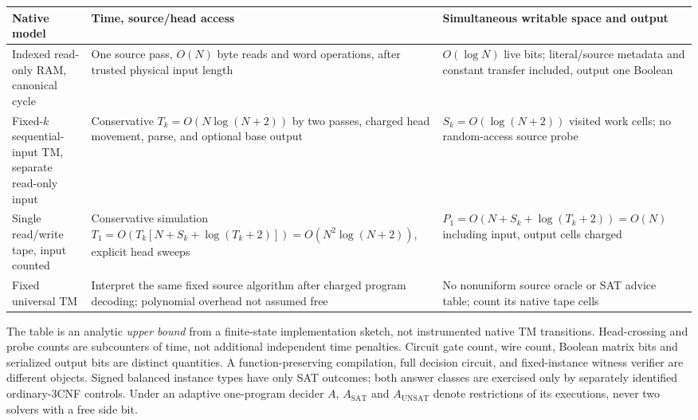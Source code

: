 \documentclass[11pt]{article}
\begin{document}
\begin{center}\small
\begin{tabular}{p{.18\linewidth}p{.35\linewidth}p{.36\linewidth}}\toprule
Native model & Time, source/head access & Simultaneous writable space and output\\\midrule
Indexed read-only RAM, canonical cycle & One source pass, $O(N)$ byte reads and word operations, after trusted physical input length & $O(\log N)$ live bits; literal/source metadata and constant transfer included, output one Boolean\\
Fixed-$k$ sequential-input TM, separate read-only input & Conservative $T_k=O(N\log(N+2))$ by two passes, charged head movement, parse, and optional base output & $S_k=O(\log(N+2))$ visited work cells; no random-access source probe\\
Single read/write tape, input counted & Conservative simulation $T_1=O(T_k[N+S_k+\log(T_k+2)])=O(N^2\log(N+2))$, explicit head sweeps & $P_1=O(N+S_k+\log(T_k+2))=O(N)$ including input, output cells charged\\
Fixed universal TM & Interpret the same fixed source algorithm after charged program decoding; polynomial overhead not assumed free & No nonuniform source oracle or SAT advice table; count its native tape cells\\\bottomrule
\end{tabular}
\end{center}
The table is an analytic \emph{upper bound} from a finite-state implementation sketch, not instrumented native TM transitions. Head-crossing and probe counts are subcounters of time, not additional independent time penalties. Circuit gate count, wire count, Boolean matrix bits and serialized output bits are distinct quantities. A function-preserving compilation, full decision circuit, and fixed-instance witness verifier are different objects. Signed balanced instance types have only SAT outcomes; both answer classes are exercised only by separately identified ordinary-3CNF controls. Under an adaptive one-program decider $A$, $A_{\mathrm{SAT}}$ and $A_{\mathrm{UNSAT}}$ denote restrictions of its executions, never two solvers with a free side bit.
\end{document}
